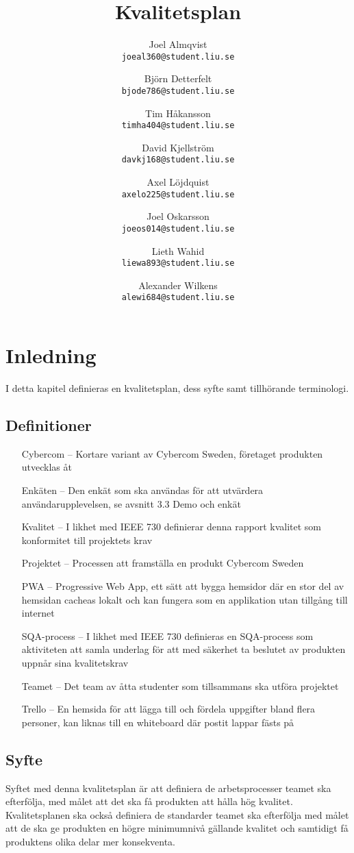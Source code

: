 \documentclass[10pt]{article}
\title{Kvalitetsplan}
\author{
    Joel Almqvist\\
    \texttt{joeal360@student.liu.se}
    \and
    Björn Detterfelt\\
    \texttt{bjode786@student.liu.se}
    \and
    Tim Håkansson\\
    \texttt{timha404@student.liu.se}
    \and
    David Kjellström\\
    \texttt{davkj168@student.liu.se}
    \and
    Axel Löjdquist\\
    \texttt{axelo225@student.liu.se}
    \and
    Joel Oskarsson\\
    \texttt{joeos014@student.liu.se}
    \and
    Lieth Wahid\\
    \texttt{liewa893@student.liu.se}
    \and
    Alexander Wilkens\\
    \texttt{alewi684@student.liu.se}
}
\begin{document}
\maketitle
\pagebreak
\tableofcontents
\pagebreak
\section{Inledning}
	I detta kapitel definieras en kvalitetsplan, dess syfte samt tillhörande terminologi.

	\subsection{Definitioner}
		\begin{itemize}
		\item [Cybercom --]Kortare variant av Cybercom Sweden, företaget produkten utvecklas åt
		\item [Enkäten --]Den enkät som ska användas för att utvärdera användarupplevelsen, se avsnitt  3.3 Demo och enkät
		\item [Kvalitet --]I likhet med IEEE 730 definierar denna rapport kvalitet som konformitet till projektets krav
		\item [Projektet --]Processen att framställa en produkt  Cybercom Sweden
		\item [PWA --]Progressive Web App, ett sätt att bygga hemsidor där en stor del av hemsidan cacheas lokalt och kan fungera som en applikation utan tillgång till internet
		\item [SQA-process --]I likhet med IEEE 730 definieras en SQA-process som aktiviteten att samla underlag för att med säkerhet ta beslutet av produkten uppnår sina kvalitetskrav
		\item [Teamet --]Det team av åtta studenter som tillsammans ska utföra projektet
		\item [Trello --]En hemsida för att lägga till och fördela uppgifter bland flera personer, kan liknas till en whiteboard där postit lappar fästs på
		\end{itemize}	
	
	\subsection{Syfte}
		Syftet med denna kvalitetsplan är att definiera de arbetsprocesser teamet ska efterfölja, med målet att det ska få produkten att hålla hög kvalitet. Kvalitetsplanen ska också definiera de standarder teamet ska efterfölja med målet att de ska ge produkten en högre minimumnivå gällande kvalitet och samtidigt få produktens olika delar mer konsekventa.
\end{document}
